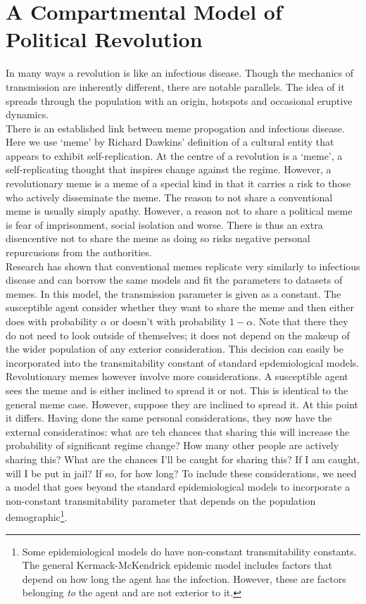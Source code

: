 \chapter{A Compartmental Model of Political Revolution}
In many ways a revolution is like an infectious disease. Though the mechanics of transmission are inherently different, there are notable parallels. The idea of it spreads through the population with an origin, hotspots and occasional eruptive dynamics.\\

There is an established link between meme propogation and infectious disease\cite{meme-epidemic}. Here we use `meme' by Richard Dawkins' definition of a cultural entity that appears to exhibit self-replication\cite{selfish-gene}. At the centre of a revolution is a `meme', a self-replicating thought that inspires change against the regime. However, a revolutionary meme is a meme of a special kind in that it carries a risk to those who actively disseminate the meme. The reason to not share a conventional meme is usually simply apathy. However, a reason not to share a political meme is fear of imprisonment, social isolation and worse. There is thus an extra disencentive not to share the meme as doing so risks negative personal repurcusions from the authorities.\\

Research has shown that conventional memes replicate very similarly to infectious disease and can borrow the same models and fit the parameters to datasets of memes\cite{meme-epidemic}. In this model, the transmission parameter is given as a constant. The susceptible agent consider whether they want to share the meme and then either does with probability $\alpha$ or doesn't with probability $1-\alpha$. Note that there they do not need to look outside of themselves; it does not depend on the makeup of the wider population of any exterior consideration. This decision can easily be incorporated into the transmitability constant of standard epdemiological models.\\

Revolutionary memes however involve more considerations. A susceptible agent sees the meme and is either inclined to spread it or not. This is identical to the general meme case. However, suppose they are inclined to spread it. At this point it differs. Having done the same personal considerations, they now have the external consideratinos: what are teh chances that sharing this will increase the probability of significant regime change? How many other people are actively sharing this? What are the chances I'll be caught for sharing this? If I am caught, will I be put in jail? If so, for how long? To include these considerations, we need a model that goes beyond the standard epidemiological models to incorporate a non-constant transmitability parameter that depends on the population demographic\footnote{Some epidemiological models do have non-constant transmitability constants. The general Kermack-McKendrick epidemic model includes factors that depend on how long the agent has the infection\cite{kermack-mckendrick}. However, these are factors belonging \textit{to} the agent and are not exterior to it.}.\\

